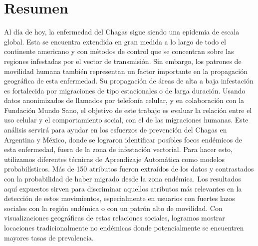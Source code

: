\chapter{Resumen}
\label{cha:resumen}

Al día de hoy, la enfermedad del Chagas sigue siendo una epidemia de escala global. Esta se encuentra extendida en gran medida a lo largo de todo el continente americano y con métodos de control que se concentran sobre las regiones infestadas por el vector de transmisión. 
Sin embargo, los patrones de movilidad humana también representan un factor importante en la propagación geográfica de esta enfermedad. Su propagación de áreas de alta a baja infestación es fortalecida por migraciones de tipo estacionales o de larga duración. 
Usando datos anonimizados de llamados por telefonía celular, y en colaboración con la Fundación Mundo Sano, el objetivo de este trabajo es evaluar la relación entre el uso celular y el comportamiento social, con el de las migraciones humanas. Este análisis servirá para ayudar en los esfuerzos de prevención del Chagas en Argentina y México, donde se lograron identificar posibles focos endémicos de esta enfermedad, fuera de la zona de infestación vectorial. Para hacer esto, utilizamos diferentes técnicas de Aprendizaje Automática como modelos probabilísticos. Más de 150 atributos fueron extraídos de los datos y contrastados con la probabilidad de haber migrado desde la zona endémica. Los resultados aquí expuestos sirven para discriminar aquellos atributos más relevantes en la detección de estos movimientos, especialmente en usuarios con fuertes lazos sociales con la región endémica o con un patrón alto de movilidad. Con visualizaciones geográficas de estas relaciones sociales, logramos mostrar locaciones tradicionalmente no endémicas donde potencialmente se encuentren mayores tasas de prevalencia.

